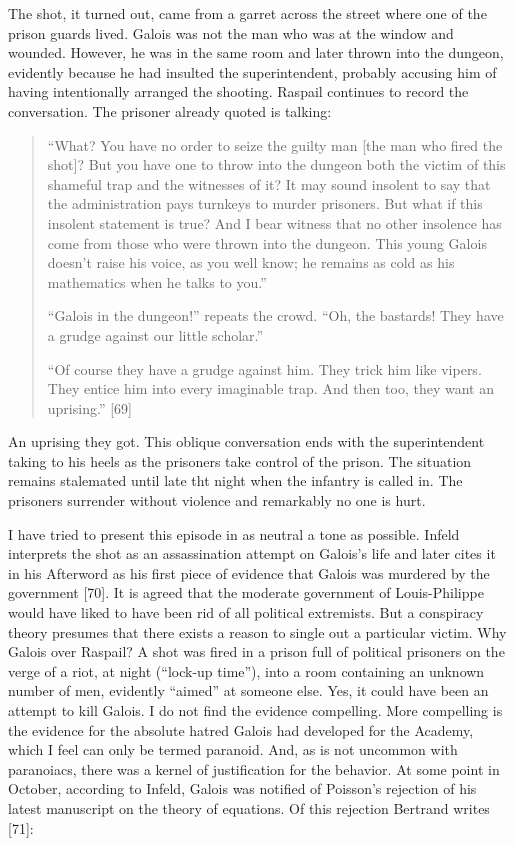 \documentclass[12pt]{article}
\begin{document}
The shot, it turned out, came from a garret across the street where one of the prison guards lived. Galois was not the man who was at the window and wounded. However, he was in the same room and later thrown into the dungeon, evidently because he had insulted the superintendent, probably accusing him of having intentionally arranged the shooting. Raspail continues to record the conversation. The prisoner already quoted is talking:

\begin{quotation}

``What? You have no order to seize the guilty man [the man who fired the shot]? But you have one to throw into the dungeon both the victim of this shameful trap and the witnesses of it? It may sound insolent to say that the administration pays turnkeys to murder prisoners. But what if this insolent statement is true? And I bear witness that no other insolence has come from those who were thrown into the dungeon. This young Galois doesn't raise his voice, as you well know; he remains as cold as his mathematics when he talks to you.''

``Galois in the dungeon!'' repeats the crowd. ``Oh, the bastards! They have a grudge against our little scholar.''

``Of course they have a grudge against him. They trick him like vipers. They entice him into every imaginable trap. And then too, they want an uprising.'' [69]

\end{quotation}

An uprising they got. This oblique conversation ends with the superintendent taking to his heels as the prisoners take control of the prison. The situation remains stalemated until late tht night when the infantry is called in. The prisoners surrender without violence and remarkably no one is hurt.

I have tried to present this episode in as neutral a tone as possible. Infeld interprets the shot as an assassination attempt on Galois's life and later cites it in his Afterword as his first piece of evidence that Galois was murdered by the government [70]. It is agreed that the moderate government of Louis-Philippe would have liked to have been rid of all political extremists. But a conspiracy theory presumes that there exists a reason to single out a particular victim. Why Galois over Raspail? A shot was fired in a prison full of political prisoners on the verge of a riot, at night (``lock-up time''), into a room containing an unknown number of men, evidently ``aimed'' at someone else. Yes, it could have been an attempt to kill Galois. I do not find the evidence compelling. More compelling is the evidence for the absolute hatred Galois had developed for the Academy, which I feel can only be termed paranoid. And, as is not uncommon with paranoiacs, there was a kernel of justification for the behavior. At some point in October, according to Infeld, Galois was notified of Poisson's rejection of his latest manuscript on the theory of equations. Of this rejection Bertrand writes [71]:
\end{document}
